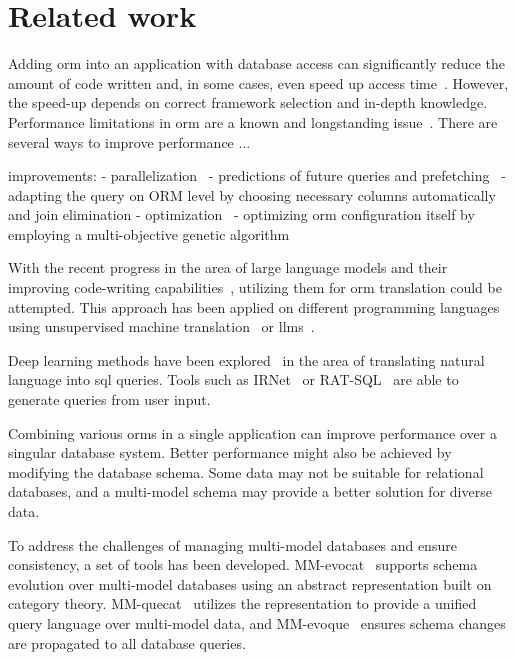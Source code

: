 \chapter{Related work}



Adding \acrshort{orm} into an application with database access can significantly reduce the amount of code written and, in some cases, even speed up access time~\cite{optimizatio_code_lines_time}. However, the speed-up depends on correct framework selection and in-depth knowledge. Performance limitations in \acrshort{orm} are a known and longstanding issue~\cite{survey_hule_ranawat_2023}. There are several ways to improve performance ...

improvements: %
- parallelization~\cite{orm_parallel}
- predictions of future queries and prefetching~\cite{prefetching} %
- adapting the query on ORM level by choosing necessary columns automatically and join elimination - optimization~\cite{quartarone2020adaptive}
- optimizing \acrshort{orm} configuration itself by employing a multi-objective genetic algorithm~\cite{orm_configuration_optimization}


With the recent progress in the area of large language models and their improving code-writing capabilities~\cite{evaluatingllms}, utilizing them for \acrshort{orm} translation could be attempted.
This approach has been applied on different programming languages using unsupervised machine translation~\cite{translation_unsupervised} or \acrshort{llm}s~\cite{transagentllm}.

Deep learning methods have been explored~\cite{text-to-sql-survey} in the area of translating natural language into \acrshort{sql} queries. Tools such as IRNet~\cite{text-to-sql-irnet} or RAT-SQL~\cite{text-to-sql-rat} are able to generate queries from user input.


Combining various \acrshort{orm}s in a single application can improve performance over a singular database system. Better performance might also be achieved by modifying the database schema. Some data may not be suitable for relational databases, and a multi-model schema may provide a better solution for diverse data. 

To address the challenges of managing multi-model databases and ensure consistency, a set of tools has been developed. MM-evocat~\cite{mm_evocat} supports schema evolution over multi-model databases using an abstract representation built on category theory. MM-quecat~\cite{mm_quecat} utilizes the representation to provide a unified query language over multi-model data, and MM-evoque~\cite{mm_evoque} ensures schema changes are propagated to all database queries. 